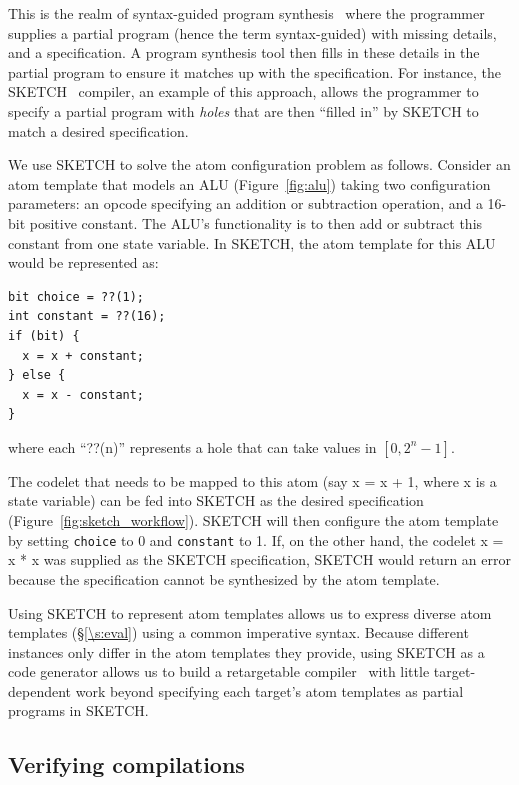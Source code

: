 This is the realm of syntax-guided program synthesis~\cite{sgsyn} where the
programmer supplies a partial program (hence the term syntax-guided) with
missing details, and a specification. A program synthesis tool then fills in
these details in the partial program to ensure it matches up with the
specification. For instance, the SKETCH~\cite{bitstreaming, finite,
sketch_manual} compiler, an example of this approach, allows the programmer to
specify a partial program with \textit{holes} that are then ``filled in'' by
SKETCH to match a desired specification.

We use SKETCH to solve the atom configuration problem as follows. Consider an
atom template that models an ALU (Figure~\ref{fig:alu}) taking two
configuration parameters: an opcode specifying an addition or subtraction
operation, and a 16-bit positive constant.  The ALU's functionality is to then
add or subtract this constant from one state variable. In SKETCH, the atom
template for this ALU would be represented as:
\begin{lstlisting}
bit choice = ??(1);
int constant = ??(16);
if (bit) {
  x = x + constant;
} else {
  x = x - constant;
}
\end{lstlisting}
where each ``??(n)'' represents a hole that can take values in $[0, 2^n -1]$.

The codelet that needs to be mapped to this atom (say x = x + 1, where x is a
state variable) can be fed into SKETCH as the desired specification
(Figure~\ref{fig:sketch_workflow}). SKETCH will then configure the atom
template by setting \texttt{choice} to 0 and \texttt{constant} to 1. If, on the
other hand, the codelet x = x * x was supplied as the SKETCH specification,
SKETCH would return an error because the specification cannot be synthesized by
the atom template.

Using SKETCH to represent atom templates allows us to express diverse atom
templates (\S\ref{\s:eval}) using a common imperative syntax. Because different
\absmachine instances only differ in the atom templates they provide, using
SKETCH as a code generator allows us to build a retargetable
compiler~\cite{rcc} with little target-dependent work beyond specifying each
target's atom templates as partial programs in SKETCH.

\subsection{Verifying compilations}

